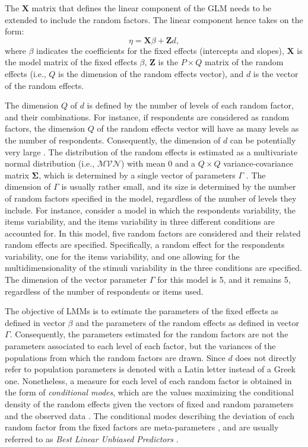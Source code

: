 \documentclass[12pt]{book}
\begin{document}
The $\bm{X}$ matrix that defines the linear component of the GLM needs to be extended to include the random factors. 
The linear component hence takes on the form:
\begin{equation}
	\eta = \bm{X}\beta + \bm{Z}d,
\end{equation}
where $\beta$ indicates the coefficients for the fixed effects (intercepts and slopes), $\bm{X}$ is the model matrix of the fixed effects $\beta$, $\bm{Z}$ is the $P \times Q$ matrix of the random effects (i.e., $Q$ is the dimension of the random effects vector), and $d$ is the vector of the random effects. 

The dimension $Q$ of $d$ is defined by the number of levels of each random factor, and their combinations. For instance, if respondents are considered as  random factors, the dimension $Q$ of the random effects vector will have as many levels as the number of respondents. 
Consequently, the dimension of $d$ can be potentially very large \cite{Doran2007}.
The distribution of the random effects is estimated as a multivariate normal distribution (i.e., $\mathcal{MVN}$) with mean 0 and a $Q \times Q$ variance-covariance matrix $\bm{\Sigma}$, which is determined by a single vector of parameters $\Gamma$ \cite{Doran2007}. 
The dimension of $\Gamma$ is usually rather small, and its size is determined by the number of random factors specified in the model, regardless of the number of levels they include.  
For instance, consider a model in which the respondents variability, the items variability, and the items variability in three different conditions are accounted for. In this model, five random factors are considered and their related random effects are specified. Specifically, a random effect for the respondents variability, one for the items variability, and one allowing for the multidimensionality of the stimuli variability in the three conditions are specified. 
The dimension of the vector parameter $\Gamma$ for this model is 5, and it remains 5, regardless of the number of respondents or items used.

The objective of LMMs is to estimate the parameters of the fixed effects as defined in vector $\beta$ and the parameters of the random effects as defined in vector $\Gamma$. Consequently, the parameters estimated for the random factors are not the parameters associated to each level of each factor, but the variances of the populations from which the random factors are drawn. Since $d$ does not directly refer to population parameters is denoted with a Latin letter instead of a Greek one. 
Nonetheless, a measure for each level of each random factor is obtained in the form of \emph{conditional modes}, which are the values maximizing the conditional density of the random effects given the vectors of fixed and random parameters and the observed data \cite{Doran2007}. 
The conditional modes describing the deviation of each random factor from the fixed factors are meta-parameters \cite{pastore}, and are usually referred to as \emph{Best Linear Unbiased Predictors} \cite<BLUP,>{pinheiro2006}. 
\end{document}
